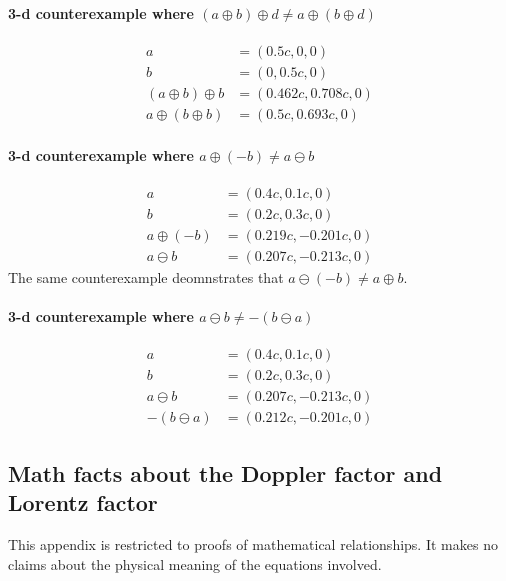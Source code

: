 \documentclass[a4paper]{article}
\theoremstyle{plain}
\theoremstyle{definition}
\begin{document}
\paragraph{3-d counterexample where $(a \oplus b) \oplus d \neq a \oplus (b \oplus d)$}
\begin{align*}
  a & = (0.5c, 0, 0) \\
  b & = (0, 0.5c, 0) \\
  (a \oplus b) \oplus b & = (0.462c, 0.708c, 0) \\
  a \oplus (b \oplus b) & = (0.5c, 0.693c, 0)
\end{align*}

\paragraph{3-d counterexample where $a \oplus (-b) \neq a \ominus b$}
\begin{align*}
  a & = (0.4c, 0.1c, 0) \\
  b & = (0.2c, 0.3c, 0) \\
  a \oplus (-b) & = (0.219c, -0.201c, 0) \\
  a \ominus b & = (0.207c, -0.213c, 0)
\end{align*}
The same counterexample deomnstrates that
$a \ominus (-b) \neq a \oplus b$.

\paragraph{3-d counterexample where $a \ominus b \neq - (b \ominus a)$}
\begin{align*}
  a & = (0.4c, 0.1c, 0) \\
  b & = (0.2c, 0.3c, 0) \\
  a \ominus b & = (0.207c, -0.213c, 0) \\
  -(b \ominus a) & = (0.212c, -0.201c, 0)
\end{align*}


\subsection{Math facts about the Doppler factor and Lorentz factor}
\label{app:DopplerFactor}

This appendix is restricted to proofs of mathematical relationships.
It makes no claims about the physical meaning of the equations
involved.
\end{document}

